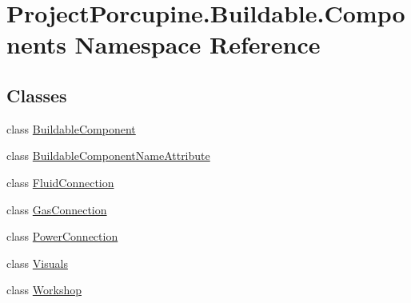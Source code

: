 \hypertarget{namespace_project_porcupine_1_1_buildable_1_1_components}{}\section{Project\+Porcupine.\+Buildable.\+Components Namespace Reference}
\label{namespace_project_porcupine_1_1_buildable_1_1_components}
\subsection*{Classes}
\begin{DoxyCompactItemize}
\item 
class \hyperlink{class_project_porcupine_1_1_buildable_1_1_components_1_1_buildable_component}{Buildable\+Component}
\item 
class \hyperlink{class_project_porcupine_1_1_buildable_1_1_components_1_1_buildable_component_name_attribute}{Buildable\+Component\+Name\+Attribute}
\item 
class \hyperlink{class_project_porcupine_1_1_buildable_1_1_components_1_1_fluid_connection}{Fluid\+Connection}
\item 
class \hyperlink{class_project_porcupine_1_1_buildable_1_1_components_1_1_gas_connection}{Gas\+Connection}
\item 
class \hyperlink{class_project_porcupine_1_1_buildable_1_1_components_1_1_power_connection}{Power\+Connection}
\item 
class \hyperlink{class_project_porcupine_1_1_buildable_1_1_components_1_1_visuals}{Visuals}
\item 
class \hyperlink{class_project_porcupine_1_1_buildable_1_1_components_1_1_workshop}{Workshop}
\end{DoxyCompactItemize}
